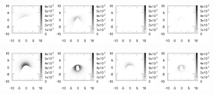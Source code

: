 \documentclass{article}
\begin{document}
\begin{figure}
	\centering
	\includegraphics[width=0.24\textwidth]{map-2Ha3wind306090}
	\includegraphics[width=0.24\textwidth]{map-2Ha3wind303060}
	\includegraphics[width=0.24\textwidth]{map-2Hb3wind306090}
	\includegraphics[width=0.24\textwidth]{map-2Hb3wind303060}
	
	\includegraphics[width=0.24\textwidth]{map-1Ha3wind306090}
	\includegraphics[width=0.24\textwidth]{map-1Ha3wind303060}
	\includegraphics[width=0.24\textwidth]{map-1Hb3wind306090}
	\includegraphics[width=0.24\textwidth]{map-1Hb3wind303060}
	

\end{figure}
\end{document}
